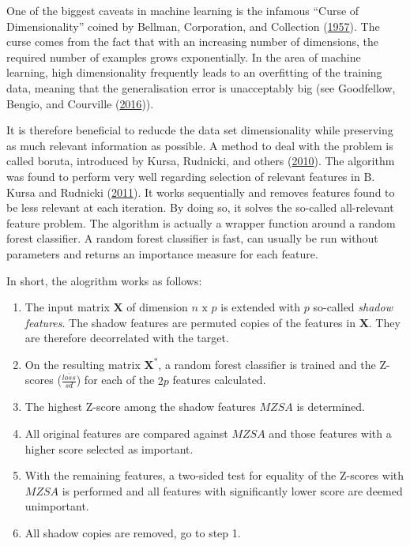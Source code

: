 \documentclass[
  11pt,
  a4paper,
  DIV=12,captions=tableheading,oneside]{scrbook}
\providecommand{\tightlist}{%
  \setlength{\itemsep}{0pt}\setlength{\parskip}{0pt}}
\providecommand{\tightlist}{%
  \setlength{\itemsep}{0pt}\setlength{\parskip}{0pt}}
\begin{document}
One of the biggest caveats in machine learning is the infamous ``Curse of Dimensionality'' coined by Bellman, Corporation, and Collection (\protect\hyperlink{ref-bellman1957dynamic}{1957}). The curse comes from the fact that with an increasing number of dimensions, the required number of examples grows exponentially. In the area of machine learning, high dimensionality frequently leads to an overfitting of the training data, meaning that the generalisation error is unacceptably big (see Goodfellow, Bengio, and Courville (\protect\hyperlink{ref-Goodfellow-et-al-2016}{2016})).

It is therefore beneficial to reducde the data set dimensionality while preserving as much relevant information as possible. A method to deal with the problem is called boruta, introduced by Kursa, Rudnicki, and others (\protect\hyperlink{ref-kursa2010boruta}{2010}). The algorithm was found to perform very well regarding selection of relevant features in B. Kursa and Rudnicki (\protect\hyperlink{ref-kursa2011boruta}{2011}). It works sequentially and removes features found to be less relevant at each iteration. By doing so, it solves the so-called all-relevant feature problem.
The algorithm is actually a wrapper function around a random forest classifier. A random forest classifier is fast, can usually be run without parameters and returns an importance measure for each feature.

In short, the alogrithm works as follows:

\begin{enumerate}
\def\labelenumi{\arabic{enumi}.}
\tightlist
\item
  The input matrix \(\mathbf{X}\) of dimension \(n\text{ x }p\) is extended with \(p\) so-called \emph{shadow features}. The shadow features are permuted copies of the features in \(\mathbf{X}\). They are therefore decorrelated with the target.
\item
  On the resulting matrix \(\mathbf{X^*}\), a random forest classifier is trained and the Z-scores (\(\frac{\bar{loss}}{sd}\)) for each of the \(2p\) features calculated.
\item
  The highest Z-score among the shadow features \(MZSA\) is determined.
\item
  All original features are compared against \(MZSA\) and those features with a higher score selected as important.
\item
  With the remaining features, a two-sided test for equality of the Z-scores with \(MZSA\) is performed and all features with significantly lower score are deemed unimportant.
\item
  All shadow copies are removed, go to step 1.
\end{enumerate}
\end{document}
